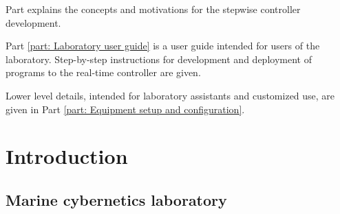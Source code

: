 \documentclass[a4paper,twoside,english]{report}
\providecommand{\printnomenclature}{\printglossary}
\begin{document}
Part \ref{part: Theory} explains the concepts and motivations for
the stepwise controller development.

Part \ref{part: Laboratory user guide} is a user guide intended for
users of the laboratory. Step-by-step instructions for development
and deployment of programs to the real-time controller are given.

Lower level details, intended for laboratory assistants and customized
use, are given in Part \ref{part: Equipment setup and configuration}.

\newpage{}\tableofcontents{}

\newpage{}\settowidth{\nomlabelwidth}{MC Lab}
\printnomenclature{}















\newpage{}


\part{Introduction}\label{part: Theory}

\chapter{Marine cybernetics laboratory}
\end{document}
